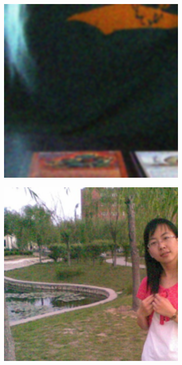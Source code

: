 \begin{figure}
\begin{subfigure}[t]{0.19\textwidth}
    \end{subfigure}
    \hfill
    \begin{subfigure}[t]{0.19\textwidth}
        \centering
        \includegraphics[width=1\textwidth]{images/guided/resize_cards.png}
    \end{subfigure}
    \hfill
    \begin{subfigure}[t]{0.19\textwidth}
        \centering
        \includegraphics[width=1\textwidth]{images/guided/resize_girl.png}

\end{subfigure}
\end{figure}
